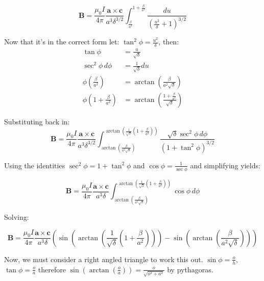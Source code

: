 \documentclass[12pt,a4paper]{report}
\theoremstyle{definition}
\begin{document}
\begin{equation}
  \mathbf{B} = \frac{\mu_0 I}{4\pi} \frac{\mathbf{a} \times \mathbf{c}}{a^3\delta^{3/2}} \int_{\frac{\beta}{a^2}}^{1+\frac{\beta}{a^2}} \frac{du}{\left(\frac{u^2}{\delta} + 1 \right)^{3/2}}
\end{equation}

Now that it's in the correct form let: $\tan^2\phi = \frac{u^2}{\delta}$, then: 
\begin{align*}
  \tan\phi &= \frac{u}{\sqrt{\delta}} \\
  \sec^2\phi \, d\phi &= \frac{1}{\sqrt{\delta}} du \\
  \phi\left(\frac{\beta}{a^2}\right) &= \arctan \left( \frac{\beta}{a^2\sqrt{\delta}} \right) \\
  \phi\left( 1 + \frac{\beta}{a^2} \right) &= \arctan \left( \frac{1+\frac{\beta}{a^2}}{\sqrt{\delta}} \right)
\end{align*}

Substituting back in:
\begin{equation}
  \mathbf{B} = \frac{\mu_0 I}{4\pi} \frac{\mathbf{a} \times \mathbf{c}}{a^3\delta^{3/2}} \int_{\arctan\left (\frac{\beta}{a^2\sqrt{\delta}}\right)}^{\arctan\left(\frac{1}{\sqrt{\delta}}\left(1+\frac{\beta}{a^2}\right)\right)} \frac{\sqrt{\delta} \sec^2 \phi \, d\phi}{\left(1 + \tan^2\phi \right)^{3/2}}
\end{equation}

Using the identities $\sec^2 \phi = 1 + \tan^2 \phi$ and $\cos \phi = \frac{1}{\sec \phi}$ and simplifying yields:

\begin{equation}
  \mathbf{B} = \frac{\mu_0 I}{4\pi} \frac{\mathbf{a} \times \mathbf{c}}{a^3\delta} \int_{\arctan\left (\frac{\beta}{a^2\sqrt{\delta}}\right)}^{\arctan\left(\frac{1}{\sqrt{\delta}}\left(1+\frac{\beta}{a^2}\right)\right)} \cos\phi \, d\phi
\end{equation}

Solving:

\begin{equation}
  \mathbf{B} = \frac{\mu_0 I}{4\pi} \frac{\mathbf{a} \times \mathbf{c}}{a^3\delta} \left ( \sin\left( \arctan\left(\frac{1}{\sqrt{\delta}}\left(1+\frac{\beta}{a^2}\right)\right)\right) - \sin \left( \arctan\left (\frac{\beta}{a^2\sqrt{\delta}}\right) \right) \right )
\end{equation}

Now, we must consider a right angled triangle to work this out. $\sin\phi = \frac{o}{h}$, $\tan\phi = \frac{o}{a}$ therefore $\sin\left( \arctan \left( \frac{o}{a} \right) \right) = \frac{o}{\sqrt{o^2 + a^2}}$ by pythagoras.
\end{document}
